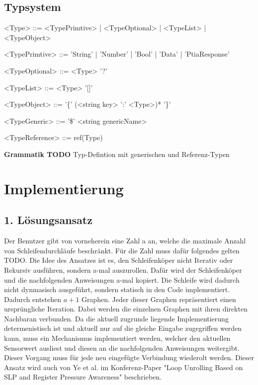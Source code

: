 \documentclass{article}
\begin{document}
    \subsection{Typsystem}
    \begin{grammar}
        <Type> ::= <TypePrimtive> | <TypeOptional> | <TypeList> | <TypeObject>

        <TypePrimtive> ::= 'String' | 'Number' | 'Bool' | 'Data' | 'PtiaResponse'
        
        <TypeOptional> ::= <Type> '?'
        
        <TypeList> ::= <Type> '[]'
        
        <TypeObject> ::= '\{' (<string key> ':' <Type>)* '\}'

        <TypeGeneric> ::= '\$' <string genericName>

        <TypeReference> ::= ref(Type)
    \end{grammar}
    \textbf{Grammatik TODO} Typ-Defintion mit generischen und Referenz-Typen
    \newpage
    \section{Implementierung}
    \subsection{1. Lösungsansatz}
    Der Benutzer gibt von vorneherein eine Zahl a an, welche die maximale Anzahl von Schleifendurchläufe beschränkt. Für die Zahl muss dafür folgendes gelten TODO.
    Die Idee des Ansatzes ist es, den Schleifenköper nicht Iterativ oder Rekursiv ausführen, sondern a-mal auszurollen.
    Dafür wird der Schleifenköper und die nachfolgenden Anweisungen a-mal kopiert. Die Schleife wird dadurch nicht dynmasisch ausgeführt, sondern statisch in den Code implementiert. Dadurch entstehen $a+1$ Graphen. Jeder dieser Graphen repräsentiert einen ursprüngliche Iteration. Dabei werden die einzelnen Graphen mit ihren direkten Nachbaran verbunden. 
    Da die aktuell zugrunde liegende Implementierung determenistisch ist und aktuell nur auf die gleiche Eingabe zugegriffen werden kann, muss ein Mechanismus implementiert werden, welcher den aktuellen Sensorwert ausliest und diesen an die nachfolgenden Anweisungen weitergibt. Dieser Vorgang muss für jede neu eingefügte Verbindung wiederolt werden.
    Dieser Ansatz wird auch von Ye et al. im Konferenz-Paper "Loop Unrolling Based on SLP and Register Pressure Awareness" beschrieben.
\end{document}
